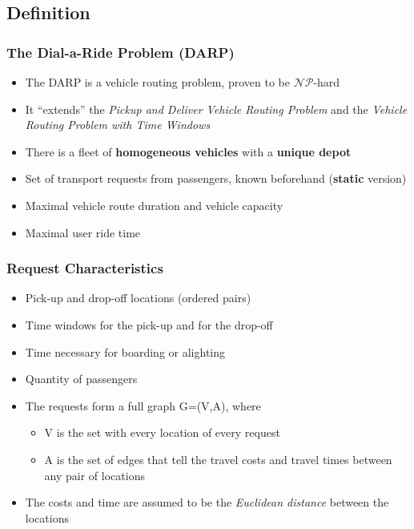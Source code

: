 \documentclass{beamer}
\begin{document}
\subsection{Definition}

\begin{frame}
\frametitle{The Dial-a-Ride Problem (DARP)}
\begin{itemize}
\item The DARP is a vehicle routing problem, proven to be $\mathcal{NP}$-hard
\item It \enquote{extends} the \emph{Pickup and Deliver Vehicle Routing Problem} and the \emph{Vehicle Routing Problem with Time Windows}
\pause
\item There is a fleet of \textbf{homogeneous vehicles} with a \textbf{unique depot}
\item Set of transport requests from passengers, known beforehand (\textbf{static} version)
\item Maximal vehicle route duration and vehicle capacity
\item Maximal user ride time
\end{itemize}
\end{frame}

\begin{frame}
\frametitle{Request Characteristics}
\begin{itemize}
\item Pick-up and drop-off locations (ordered pairs)
\item Time windows for the pick-up and for the drop-off
\item Time necessary for boarding or alighting
\item Quantity of passengers
\pause
\item The requests form a full graph G=(V,A), where
	\begin{itemize}
	\item V is the set with every location of every request
	\item A is the set of edges that tell the travel costs and travel times between any pair of locations
	\end{itemize}
\pause
\item The costs and time are assumed to be the \emph{Euclidean distance} between the locations
\end{itemize}
\end{frame}
\end{document}
